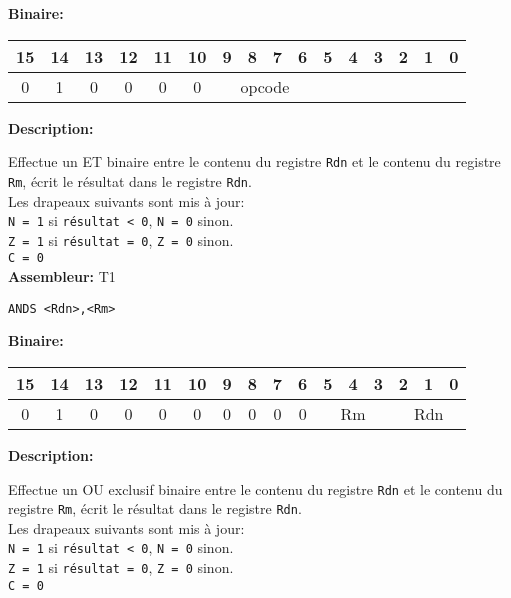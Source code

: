 \textbf{Binaire:}\\

\begin{tabular}{| c c c c c c c c c c c c c c c c |}
\hline
15 & 14 & 13 & 12 & 11 & 10 & \multicolumn{1}{|c}{9} & 8 & 7 & 6 & \multicolumn{1}{|c}{5} & 4 & 3 & 2 & 1 & 0 \\
\hline
0 & 1 & 0 & 0 & 0 & 0 & \multicolumn{4}{|c}{opcode} & \multicolumn{6}{|c|}{} \\
\hline
\end{tabular}


\textbf{Description: }

Effectue un ET binaire entre le contenu du registre \texttt{Rdn} et le contenu du registre \texttt{Rm}, écrit le résultat dans le registre \texttt{Rdn}.\\
Les drapeaux suivants sont mis à jour:\\
\texttt{N = 1} si \texttt{résultat < 0}, \texttt{N = 0} sinon.\\
\texttt{Z = 1} si \texttt{résultat = 0}, \texttt{Z = 0} sinon.\\
\texttt{C = 0}\\

\textbf{Assembleur:} T1

\begin{lstlisting}
ANDS <Rdn>,<Rm>
\end{lstlisting}

\textbf{Binaire:}\\

\begin{tabular}{| c c c c c c c c c c c c c c c c |}
\hline
15 & 14 & 13 & 12 & 11 & 10 & \multicolumn{1}{|c}{9} & 8 & 7 & 6 & \multicolumn{1}{|c}{5} & 4 & 3 & \multicolumn{1}{|c}{2} & 1 & 0 \\
\hline
0 & 1 & 0 & 0 & 0 & 0 & \multicolumn{1}{|c}{0} & 0 & 0 & 0 & \multicolumn{3}{|c}{Rm} & \multicolumn{3}{|c|}{Rdn} \\
\hline
\end{tabular}



\textbf{Description: }

Effectue un OU exclusif binaire entre le contenu du registre \texttt{Rdn} et le contenu du registre \texttt{Rm}, écrit le résultat dans le registre \texttt{Rdn}.\\
Les drapeaux suivants sont mis à jour:\\
\texttt{N = 1} si \texttt{résultat < 0}, \texttt{N = 0} sinon.\\                                                                  
\texttt{Z = 1} si \texttt{résultat = 0}, \texttt{Z = 0} sinon.\\
\texttt{C = 0}\\

